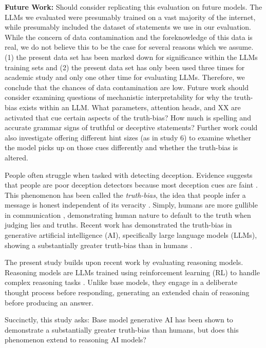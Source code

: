 \documentclass{article}
\begin{document}
\textbf{Future Work:} Should consider replicating this evaluation on future models. The LLMs we evaluated were presumably trained on a vast majority of the internet, while presumably included the dataset of statements we use in our evaluation. While the concern of data contamination and the foreknowledge of this data is real, we do not believe this to be the case for several reasons which we assume. (1) the present data set has been marked down for significance within the LLMs training sets and (2) the present data set has only been used three times for academic study and only one other time for evaluating LLMs. Therefore, we conclude that the chances of data contamination are low. Future work should consider examining questions of mechanistic interpretability for why the truth-bias exists within an LLM. What parameters, attention heads, and XX are activated that cue certain aspects of the truth-bias? How much is spelling and accurate grammar signs of truthful or deceptive statements? Further work could also investigate offering different hint sizes (as in study 6) to examine whether the model picks up on those cues differently and whether the truth-bias is altered. 

People often struggle when tasked with detecting deception. Evidence suggests that people are poor deception detectors because most deception cues are faint \citep{depaulo_cues_2003, hartwig_why_2011,luke_lessons_2019}. This phenomenon has been called the \textit{truth-bias}, the idea that people infer a message is honest independent of its veracity \citep{levine_truth-default_2014, mclaughlin_communication_2012}. Simply, humans are more gullible in communication \citep{levine_duped_2020}, demonstrating human nature to default to the truth when judging lies and truths. Recent work has demonstrated the truth-bias in generative artificial intelligence (AI), specifically large language models (LLMs), showing a substantially greater truth-bias than in humans \citep{markowitz_generative_2024}.

The present study builds upon recent work \citep{markowitz_generative_2024} by evaluating reasoning models. Reasoning models are LLMs trained using reinforcement learning (RL) to handle complex reasoning tasks \citep{openai_reasoning_2025}. Unlike base models, they engage in a deliberate thought process before responding, generating an extended chain of reasoning before producing an answer.

Succinctly, this study asks: Base model generative AI has been shown to demonstrate a substantially greater truth-bias than humans, but does this phenomenon extend to reasoning AI models?
\end{document}
